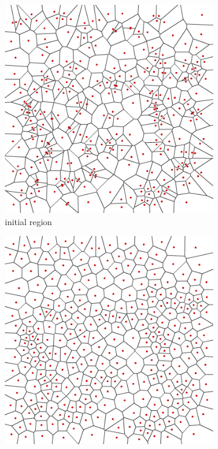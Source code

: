 \documentclass[journal, letterpaper]{IEEEtran}
\begin{document}
\begin{figure}
	\centering
	\begin{subfigure}[b]{0.3\textwidth}
		\includegraphics[width=\textwidth]{images/voronoi-polygons}
		\caption{initial region}
		\label{fig:voronoi}
	\end{subfigure}
	\begin{subfigure}[b]{0.3\textwidth}
		\includegraphics[width=\textwidth]{images/voronoi-2-lloyd}

\end{subfigure}
\end{figure}
\end{document}
